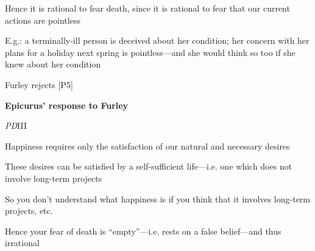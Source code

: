 \documentclass[11pt]{article}
\begin{document}
\noindent [3] Hence it is rational to fear death, since it is rational to fear that our current actions are pointless
\vspace*{1mm}

\noindent E.g.: a terminally-ill person is deceived about her condition; her concern with her plans for a holiday next spring is pointless---and she would think so too if she knew about her condition
\vspace*{2mm}

\noindent Furley rejects [P5]
\vspace*{5mm}

\noindent \textbf{Epicurus' response to Furley}
\vspace*{2mm}

\noindent \emph{PD}III
\vspace*{1mm}

\noindent [1] Happiness requires only the satisfaction of our natural and necessary desires
\vspace*{1mm}

\noindent [2] These desires can be satisfied by a self-sufficient life---i.e. one which does not involve long-term projects
\vspace*{1mm}

\noindent [3] So you don't understand what happiness is if you think that it involves long-term projects, etc.
\vspace*{1mm}

\noindent [4] Hence your fear of death is ``empty''---i.e. rests on a false belief---and thus irrational
\end{document}
